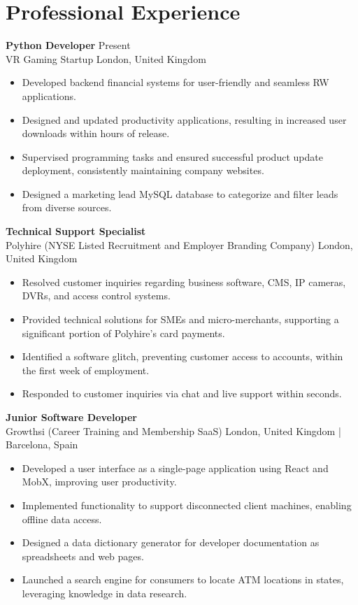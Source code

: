 \documentclass[letterpaper, 10pt]{article}
\begin{document}
\section{Professional Experience}

\textbf{Python Developer} \hfill Present \\
VR Gaming Startup \hfill London, United Kingdom

\begin{itemize}[leftmargin=*, nosep]
    \item Developed backend financial systems for user-friendly and seamless RW applications.
    \item Designed and updated productivity applications, resulting in increased user downloads within hours of release.
    \item Supervised programming tasks and ensured successful product update deployment, consistently maintaining company websites.
    \item Designed a marketing lead MySQL database to categorize and filter leads from diverse sources.
\end{itemize}

\textbf{Technical Support Specialist} \hfill  \\
Polyhire (NYSE Listed Recruitment and Employer Branding Company) \hfill London, United Kingdom

\begin{itemize}[leftmargin=*, nosep]
    \item Resolved customer inquiries regarding business software, CMS, IP cameras, DVRs, and access control systems.
    \item Provided technical solutions for SMEs and micro-merchants, supporting a significant portion of Polyhire's card payments.
    \item Identified a software glitch, preventing customer access to accounts, within the first week of employment.
    \item Responded to customer inquiries via chat and live support within seconds.
\end{itemize}

\textbf{Junior Software Developer} \hfill  \\
Growthsi (Career Training and Membership SaaS) \hfill London, United Kingdom | Barcelona, Spain

\begin{itemize}[leftmargin=*, nosep]
    \item Developed a user interface as a single-page application using React and MobX, improving user productivity.
    \item Implemented functionality to support disconnected client machines, enabling offline data access.
    \item Designed a data dictionary generator for developer documentation as spreadsheets and web pages.
    \item Launched a search engine for consumers to locate ATM locations in states, leveraging knowledge in data research.
\end{itemize}
\end{document}
